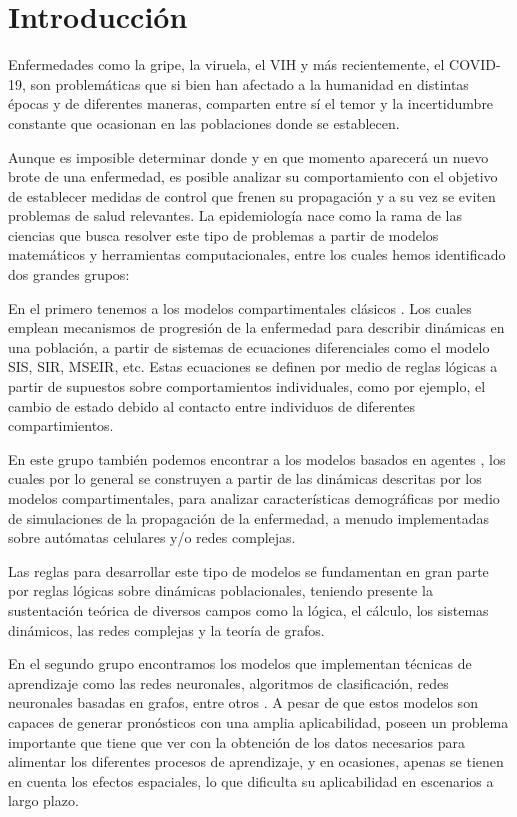\chapter{Introducción}\label{ch;Introduccion}

Enfermedades como la gripe, la viruela, el VIH y más recientemente, el COVID-19, son problemáticas que si bien han afectado a la humanidad en distintas épocas y de diferentes maneras, comparten entre sí el temor y la incertidumbre constante que ocasionan en las poblaciones donde se establecen.

Aunque es imposible determinar donde y en que momento aparecerá un nuevo brote de una enfermedad, es posible analizar su comportamiento con el objetivo de establecer medidas de control que frenen su propagación y a su vez se eviten problemas de salud relevantes. La epidemiología nace como la rama de las ciencias que busca resolver este tipo de problemas a partir de modelos matemáticos y herramientas computacionales, entre los cuales hemos identificado dos grandes grupos: 

En el primero tenemos a los modelos compartimentales clásicos \cite{kermack, miller, hertbert, mateModelsInPopulationAndEpidemiology, diego2010}. Los cuales emplean mecanismos de progresión de la enfermedad para describir dinámicas en una población, a partir de sistemas de ecuaciones diferenciales como el modelo SIS, SIR, MSEIR, etc. Estas ecuaciones se definen por medio de reglas lógicas a partir de supuestos sobre comportamientos individuales, como por ejemplo, el cambio de estado debido al contacto entre individuos de diferentes compartimientos.
    
En este grupo también podemos encontrar a los modelos basados en agentes \cite{spatialDependences,populationDensity,modelingEpidemicsUsingCA, globalStochastic}, los cuales por lo general se construyen a partir de las dinámicas descritas por los modelos compartimentales, para analizar características demográficas por medio de simulaciones de la propagación de la enfermedad, a menudo implementadas sobre autómatas celulares y/o redes complejas. 
    
Las reglas para desarrollar este tipo de modelos se fundamentan en gran parte por reglas lógicas sobre dinámicas poblacionales, teniendo presente la sustentación teórica de diversos campos como la lógica, el cálculo, los sistemas dinámicos, las redes complejas y la teoría de grafos.

En el segundo grupo encontramos los modelos que implementan técnicas de aprendizaje como las redes neuronales, algoritmos de clasificación, redes neuronales basadas en grafos, entre otros \cite{stayHome, epidemiologicalNeuralNetwork, colaGNN, combiningGraph, forecasting, fromNeuronsToEpidemics, networksAndepidemics, transfer2021}. A pesar de que estos modelos son capaces de generar pronósticos con una amplia aplicabilidad, poseen un problema importante que tiene que ver con la obtención de los datos necesarios para alimentar los diferentes procesos de aprendizaje, y en ocasiones, apenas se tienen en cuenta los efectos espaciales, lo que dificulta su aplicabilidad en escenarios a largo plazo.

